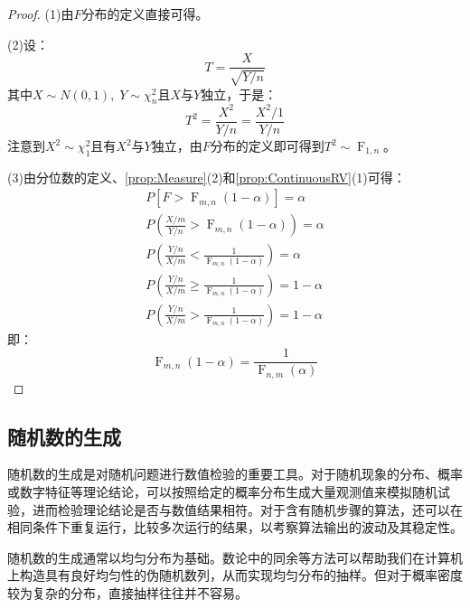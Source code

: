 \begin{proof}
	(1)由$F$分布的定义直接可得。\par
	(2)设：
	\begin{equation*}
		T=\frac{X}{\sqrt{Y/n}}
	\end{equation*}
	其中$X\sim N(0,1),\;Y\sim\chi_n^2$且$X$与$Y$独立，于是：
	\begin{equation*}
		T^2=\frac{X^2}{Y/n}=\frac{X^2/1}{Y/n}
	\end{equation*}
	注意到$X^2\sim\chi_1^2$且有$X^2$与$Y$独立，由$F$分布的定义即可得到$T^2\sim \operatorname{F}_{1,n}$。\par
	(3)由分位数的定义、\cref{prop:Measure}(2)和\cref{prop:ContinuousRV}(1)可得：
	\begin{gather*}
		P[F>\operatorname{F}_{m,n}(1-\alpha)]=\alpha \\
		P\left(\frac{X/m}{Y/n}>\operatorname{F}_{m,n}(1-\alpha)\right)=\alpha \\
		P\left(\frac{Y/n}{X/m}<\frac{1}{\operatorname{F}_{m,n}(1-\alpha)}\right)=\alpha \\
		P\left(\frac{Y/n}{X/m}\geqslant\frac{1}{\operatorname{F}_{m,n}(1-\alpha)}\right)=1-\alpha \\
		P\left(\frac{Y/n}{X/m}>\frac{1}{\operatorname{F}_{m,n}(1-\alpha)}\right)=1-\alpha
	\end{gather*}
	即：
	\begin{equation*}
		\operatorname{F}_{m,n}(1-\alpha)=\frac{1}{\operatorname{F}_{n,m}(\alpha)}
	\end{equation*}
\end{proof}

\subsection{随机数的生成}
随机数的生成是对随机问题进行数值检验的重要工具。对于随机现象的分布、概率或数字特征等理论结论，可以按照给定的概率分布生成大量观测值来模拟随机试验，进而检验理论结论是否与数值结果相符。对于含有随机步骤的算法，还可以在相同条件下重复运行，比较多次运行的结果，以考察算法输出的波动及其稳定性。\par
随机数的生成通常以均匀分布为基础。数论中的同余等方法可以帮助我们在计算机上构造具有良好均匀性的伪随机数列，从而实现均匀分布的抽样。但对于概率密度较为复杂的分布，直接抽样往往并不容易。
